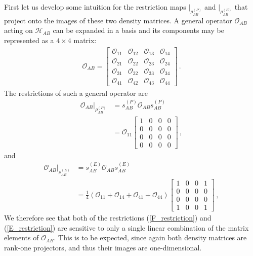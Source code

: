 \documentclass[12pt]{article}
\numberwithin{equation}{section}
\begin{document}
First let us develop some intuition for the restriction maps $\big\vert_{\rho_{AB}^{(P)}}$ and $\big\vert_{\rho_{AB}^{(E)}}$ that project onto the images of these two density matrices. A general operator $\mathcal{O}_{AB}$ acting on $\mathcal{H}_{AB}$ can be expanded in a basis and its components may be represented as a $4 \times 4$ matrix:
%
\begin{align}
    \mathcal{O}_{AB} = \begin{bmatrix} \mathcal{O}_{11} & \mathcal{O}_{12} & \mathcal{O}_{13} & \mathcal{O}_{14} \\ \mathcal{O}_{21} & \mathcal{O}_{22} & \mathcal{O}_{23} & \mathcal{O}_{24} \\ \mathcal{O}_{31} & \mathcal{O}_{32} & \mathcal{O}_{33} & \mathcal{O}_{34} \\ \mathcal{O}_{41} & \mathcal{O}_{42} & \mathcal{O}_{43} & \mathcal{O}_{44} \end{bmatrix} \, .
\end{align}
%
The restrictions of such a general operator are
%
\begin{align}\label{F_restriction}
    \mathcal{O}_{AB} \big\vert_{\rho_{AB}^{(P)}} &= s_{AB}^{(P)} \mathcal{O}_{AB} s_{AB}^{(P)} \nonumber \\
    &= \mathcal{O}_{11} \begin{bmatrix} 1 & 0 & 0 & 0 \\ 0 & 0 & 0 & 0 \\ 0 & 0 & 0 & 0 \\ 0 & 0 & 0 & 0 \end{bmatrix} \, ,
\end{align}
%
and
%
\begin{align}\label{E_restriction}
    \mathcal{O}_{AB} \big\vert_{\rho_{AB}^{(E)}} &= s_{AB}^{(E)} \mathcal{O}_{AB} s_{AB}^{(E)} \nonumber \\
    &= \frac{1}{4} \left( \mathcal{O}_{11} + \mathcal{O}_{14} + \mathcal{O}_{41} + \mathcal{O}_{44} \right) \begin{bmatrix} 1 & 0 & 0 & 1 \\ 0 & 0 & 0 & 0 \\ 0 & 0 & 0 & 0 \\ 1 & 0 & 0 & 1 \end{bmatrix} \, ,
\end{align}
%
We therefore see that both of the restrictions (\ref{F_restriction}) and (\ref{E_restriction}) are sensitive to only a single linear combination of the matrix elements of $\mathcal{O}_{AB}$. This is to be expected, since again both density matrices are rank-one projectors, and thus their images are one-dimensional.
\end{document}
